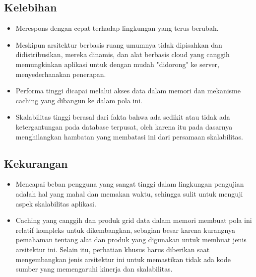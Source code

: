 	\subsection*{\LARGE{Kelebihan}}
	\begin{itemize}
		\item \large Merespons dengan cepat terhadap lingkungan yang terus berubah.
		\item \large Meskipun arsitektur berbasis ruang umumnya tidak dipisahkan dan didistribusikan, mereka dinamis, dan alat berbasis cloud yang canggih memungkinkan aplikasi untuk dengan mudah "didorong" ke server, menyederhanakan penerapan.
		\item \large Performa tinggi dicapai melalui akses data dalam memori dan mekanisme caching yang dibangun ke dalam pola ini.
		\item \large Skalabilitas tinggi berasal dari fakta bahwa ada sedikit atau tidak ada ketergantungan pada database terpusat, oleh karena itu pada dasarnya menghilangkan hambatan yang membatasi ini dari persamaan skalabilitas.
	\end{itemize} 
	\subsection*{\LARGE{Kekurangan}}
	\begin{itemize}
		\item \large Mencapai beban pengguna yang sangat tinggi dalam lingkungan pengujian adalah hal yang mahal dan memakan waktu, sehingga sulit untuk menguji aspek skalabilitas aplikasi.
		\item \large Caching yang canggih dan produk grid data dalam memori membuat pola ini relatif kompleks untuk dikembangkan, sebagian besar karena kurangnya pemahaman tentang alat dan produk yang digunakan untuk membuat jenis arsitektur ini. Selain itu, perhatian khusus harus diberikan saat mengembangkan jenis arsitektur ini untuk memastikan tidak ada kode sumber yang memengaruhi kinerja dan skalabilitas.
	\end{itemize}
